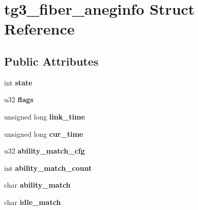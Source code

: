 \hypertarget{structtg3__fiber__aneginfo}{
\section{tg3\_\-fiber\_\-aneginfo Struct Reference}
\label{structtg3__fiber__aneginfo}
}
\subsection*{Public Attributes}
\begin{DoxyCompactItemize}
\item 
\hypertarget{structtg3__fiber__aneginfo_a8c42dcd35a636b89e260fdb50a4bdc5b}{
int {\bfseries state}}
\label{structtg3__fiber__aneginfo_a8c42dcd35a636b89e260fdb50a4bdc5b}

\item 
\hypertarget{structtg3__fiber__aneginfo_a500c2f87c6ddee2c7d1aba1857ca2226}{
u32 {\bfseries flags}}
\label{structtg3__fiber__aneginfo_a500c2f87c6ddee2c7d1aba1857ca2226}

\item 
\hypertarget{structtg3__fiber__aneginfo_a3ed0a9d69d6ce14f0a6e2b79fe484b03}{
unsigned long {\bfseries link\_\-time}}
\label{structtg3__fiber__aneginfo_a3ed0a9d69d6ce14f0a6e2b79fe484b03}

\item 
\hypertarget{structtg3__fiber__aneginfo_a0221ff39dde67969cf27d7d0be9c587b}{
unsigned long {\bfseries cur\_\-time}}
\label{structtg3__fiber__aneginfo_a0221ff39dde67969cf27d7d0be9c587b}

\item 
\hypertarget{structtg3__fiber__aneginfo_a0bca78ec5acd0eaaabd43f9c4fa8fc05}{
u32 {\bfseries ability\_\-match\_\-cfg}}
\label{structtg3__fiber__aneginfo_a0bca78ec5acd0eaaabd43f9c4fa8fc05}

\item 
\hypertarget{structtg3__fiber__aneginfo_af28f7f4deef866e2442038669c4957c2}{
int {\bfseries ability\_\-match\_\-count}}
\label{structtg3__fiber__aneginfo_af28f7f4deef866e2442038669c4957c2}

\item 
\hypertarget{structtg3__fiber__aneginfo_abb0ab6db3b6f3ef2de87f3e3e275d054}{
char {\bfseries ability\_\-match}}
\label{structtg3__fiber__aneginfo_abb0ab6db3b6f3ef2de87f3e3e275d054}

\item 
\hypertarget{structtg3__fiber__aneginfo_a85f59639969d534719495418bbaa7a28}{
char {\bfseries idle\_\-match}}
\label{structtg3__fiber__aneginfo_a85f59639969d534719495418bbaa7a28}


\end{DoxyCompactItemize}
